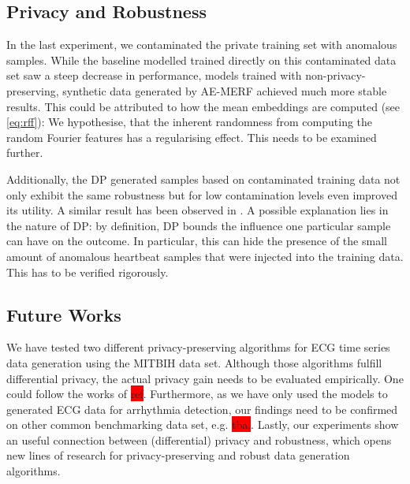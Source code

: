 \subsection{Privacy and Robustness}
In the last experiment, we contaminated the private training set with anomalous samples. While the baseline modelled trained directly on this contaminated data set saw a steep decrease in performance, models trained with non-privacy-preserving, synthetic data generated by AE-MERF achieved much more stable results. This could be attributed to how the mean embeddings are computed (see \cref{eq:rff}): We hypothesise, that the inherent randomness from computing the random Fourier features has a regularising effect. This needs to be examined further.

Additionally, the DP generated samples based on contaminated training data not only exhibit the same robustness but for low contamination levels even improved its utility. A similar result has been observed in \parencite{du2019robust}. A possible explanation lies in the nature of DP: by definition, DP bounds the influence one particular sample can have on the outcome. In particular, this can hide the presence of the small amount of anomalous heartbeat samples that were injected into the training data. This has to be verified rigorously.


\subsection{Future Works}

We have tested two different privacy-preserving algorithms for ECG time series data generation using the MITBIH data set. Although those algorithms fulfill differential privacy, the actual privacy gain needs to be evaluated empirically. One could follow the works of \colorbox{red}{ref}. 
Furthermore, as we have only used the models to generated ECG data for arrhythmia detection, our findings need to be confirmed on other common benchmarking data set, e.g. \colorbox{red}{tba.}.
Lastly, our experiments show an useful connection between (differential) privacy and robustness, which opens new lines of research for privacy-preserving and robust data generation algorithms.

